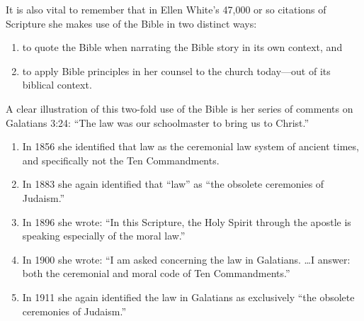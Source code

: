 It is also vital to remember that in Ellen White's 47,000 or so citations
of Scripture she makes use of the Bible in two distinct ways:
\begin{enumerate}
        \item to quote the Bible when narrating the Bible story in its own
            context, and
        \item to apply Bible principles in her counsel to the church today---out
            of its biblical context. 
\end{enumerate}
\newpage
A clear illustration of this two-fold use of the Bible is her series of
comments on Galatians 3:24: ``The law was our schoolmaster to bring us to
Christ.''
\begin{enumerate}
        \item In 1856 she identified that law as the ceremonial law system of
ancient times, and specifically not the Ten Commandments.
        \item In 1883 she
        again identified that ``law'' as ``the obsolete ceremonies of Judaism.''\cite{16}
        \item In 1896 she wrote: ``In this Scripture, the Holy Spirit through the apostle
            is speaking especially of the moral law.''\cite{17}
        \item In 1900 she wrote: ``I am
asked concerning the law in Galatians. \ldots I answer: both the ceremonial and
        moral code of Ten Commandments.''\cite{18} 
    \item In 1911 she again identified the law
        in Galatians as exclusively ``the obsolete ceremonies of Judaism.''\cite{19}
\end{enumerate}

